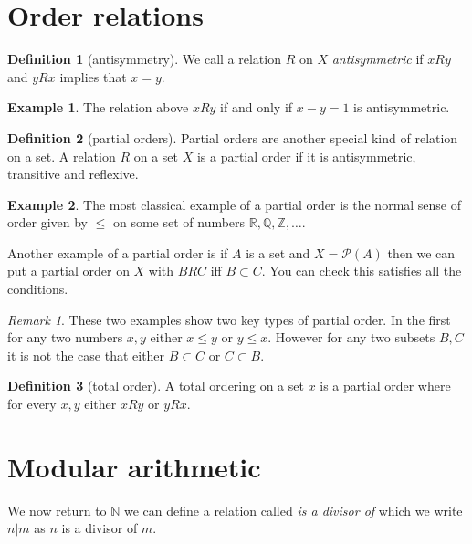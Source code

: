 \documentclass[
]{book}
\theoremstyle{definition}
\newtheorem{definition}{Definition}[chapter]
\theoremstyle{definition}
\newtheorem{example}{Example}[chapter]
\theoremstyle{definition}
\theoremstyle{definition}
\theoremstyle{remark}
\newtheorem*{remark}{Remark}
\begin{document}
\section{Order relations}\label{order-relations}

\begin{definition}[antisymmetry]
We call a relation \(R\) on \(X\) \emph{antisymmetric} if \(x R y\) and \(y R x\) implies that \(x=y\).
\end{definition}

\begin{example}
The relation above \(x R y\) if and only if \(x-y=1\) is antisymmetric.
\end{example}

\begin{definition}[partial orders]
Partial orders are another special kind of relation on a set. A relation \(R\) on a set \(X\) is a partial order if it is antisymmetric, transitive and reflexive.
\end{definition}

\begin{example}
The most classical example of a partial order is the normal sense of order given by \(\leq\) on some set of numbers \(\mathbb{R}, \mathbb{Q}, \mathbb{Z}, \dots\).

Another example of a partial order is if \(A\) is a set and \(X = \mathcal{P}(A)\) then we can put a partial order on \(X\) with \(B R C\) iff \(B \subset C\). You can check this satisfies all the conditions.
\end{example}

\begin{remark}
These two examples show two key types of partial order. In the first for any two numbers \(x,y\) either \(x \leq y\) or \(y \leq x\). However for any two subsets \(B, C\) it is not the case that either \(B \subset C\) or \(C \subset B\).
\end{remark}

\begin{definition}[total order]
A total ordering on a set \(x\) is a partial order where for every \(x,y\) either \(xRy\) or \(yRx\).
\end{definition}

\section{Modular arithmetic}\label{modular-arithmetic}

We now return to \(\mathbb{N}\) we can define a relation called \emph{is a divisor of} which we write \(n|m\) as \(n\) is a divisor of \(m\).
\end{document}
